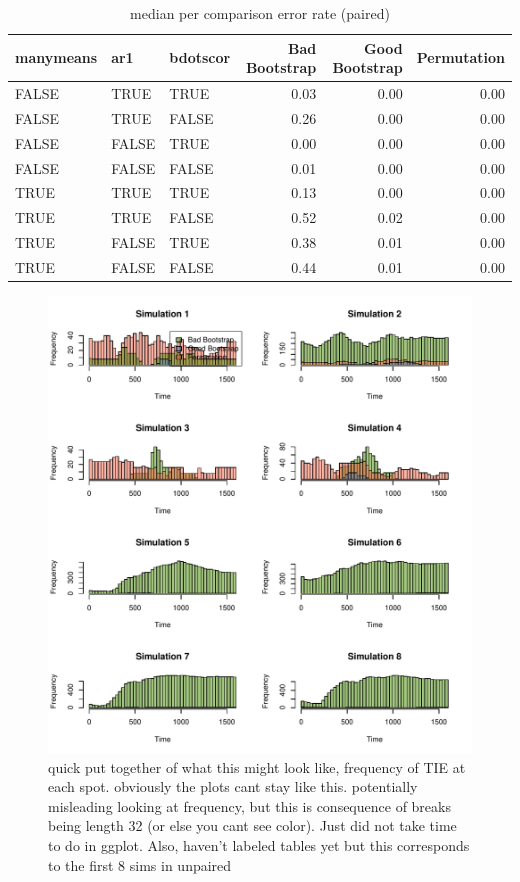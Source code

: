 \documentclass{article}
\begin{document}
\begin{table}[H]
\centering
\begin{tabular}{lllrrr}
  \hline
  manymeans & ar1 & bdotscor &  Bad Bootstrap & Good Bootstrap & Permutation  \\ 
  \hline
FALSE & TRUE & TRUE & 0.03 & 0.00 & 0.00 \\ 
  FALSE & TRUE & FALSE & 0.26 & 0.00 & 0.00 \\ 
  FALSE & FALSE & TRUE & 0.00 & 0.00 & 0.00 \\ 
  FALSE & FALSE & FALSE & 0.01 & 0.00 & 0.00 \\ 
  TRUE & TRUE & TRUE & 0.13 & 0.00 & 0.00 \\ 
  TRUE & TRUE & FALSE & 0.52 & 0.02 & 0.00 \\ 
  TRUE & FALSE & TRUE & 0.38 & 0.01 & 0.00 \\ 
  TRUE & FALSE & FALSE & 0.44 & 0.01 & 0.00 \\ 
   \hline
\end{tabular}
\caption{median per comparison error rate (paired)}
\end{table}

\begin{figure}
\centering
\includegraphics{TEMP_histogram.pdf}
\caption{quick put together of what this might look like, frequency of TIE at each spot. obviously the plots cant stay like this. potentially misleading looking at frequency, but this is consequence of breaks being length 32 (or else you cant see color). Just did not take time to do in ggplot. Also, haven't labeled tables yet but this corresponds to the first 8 sims in unpaired}
\end{figure}
\end{document}
